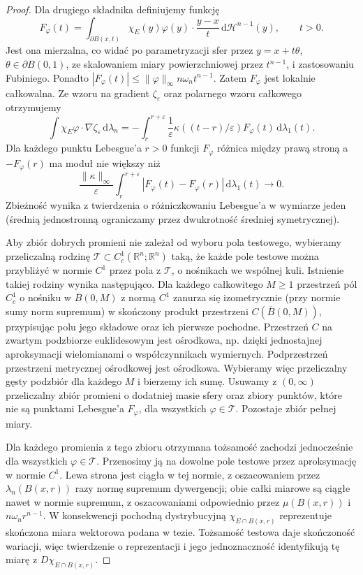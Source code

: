 \begin{proof}
Dla drugiego składnika definiujemy funkcję
\[
 F_\varphi(t)=\int_{\partial B(x,t)}
 \chi_E(y)\varphi(y)\cdot\frac{y-x}{t}
 \,\mathrm d\mathcal H^{n-1}(y),\qquad t>0.
\]
Jest ona mierzalna, co widać po parametryzacji
sfer przez $y=x+t\theta$, $\theta\in\partial B(0,1)$,
ze skalowaniem miary powierzchniowej przez $t^{n-1}$,
i zastosowaniu Fubiniego. Ponadto
$|F_\varphi(t)|\le\|\varphi\|_\infty n\omega_n t^{n-1}$.
Zatem $F_\varphi$ jest lokalnie całkowalna.
Ze wzoru na gradient $\zeta_\varepsilon$ oraz
polarnego wzoru całkowego otrzymujemy
\[
 \int\chi_E\varphi\cdot\nabla\zeta_\varepsilon
 \,\mathrm d\lambda_n
 =-\int_r^{r+\varepsilon}
 \frac1\varepsilon\kappa((t-r)/\varepsilon)
 F_\varphi(t)\,\mathrm d\lambda_1(t).
\]
Dla każdego punktu Lebesgue'a $r>0$ funkcji
$F_\varphi$ różnica między prawą stroną a
$-F_\varphi(r)$ ma moduł nie większy niż
\[
 \frac{\|\kappa\|_\infty}{\varepsilon}
 \int_r^{r+\varepsilon}|F_\varphi(t)-F_\varphi(r)|
 \,\mathrm d\lambda_1(t)\longrightarrow0.
\]
Zbieżność wynika z twierdzenia o różniczkowaniu
Lebesgue'a w wymiarze jeden (średnią jednostronną
ograniczamy przez dwukrotność średniej symetrycznej).

Aby zbiór dobrych promieni nie zależał od wyboru
pola testowego, wybieramy przeliczalną rodzinę
$\mathcal T\subset C_c^1(\mathbb R^n;\mathbb R^n)$
taką, że każde pole testowe można przybliżyć
w normie $C^1$ przez pola z $\mathcal T$,
o nośnikach we wspólnej kuli.
Istnienie takiej rodziny wynika następująco.
Dla każdego całkowitego $M\ge1$ przestrzeń pól
$C_c^1$ o nośniku w $\overline B(0,M)$
z normą $C^1$ zanurza się izometrycznie
(przy normie sumy norm supremum) w skończony
produkt przestrzeni $C(\overline B(0,M))$,
przypisując polu jego składowe oraz ich pierwsze
pochodne. Przestrzeń $C$ na zwartym podzbiorze
euklidesowym jest ośrodkowa, np. dzięki jednostajnej
aproksymacji wielomianami o współczynnikach wymiernych.
Podprzestrzeń przestrzeni metrycznej ośrodkowej
jest ośrodkowa. Wybieramy więc przeliczalny
gęsty podzbiór dla każdego $M$ i bierzemy ich sumę.
Usuwamy z $(0,\infty)$ przeliczalny zbiór promieni
o dodatniej masie sfery oraz zbiory punktów,
które nie są punktami Lebesgue'a $F_\varphi$,
dla wszystkich $\varphi\in\mathcal T$.
Pozostaje zbiór pełnej miary.

Dla każdego promienia z tego zbioru otrzymana
tożsamość zachodzi jednocześnie dla wszystkich
$\varphi\in\mathcal T$. Przenosimy ją na dowolne
pole testowe przez aproksymację w normie $C^1$.
Lewa strona jest ciągła w tej normie, z oszacowaniem
przez $\lambda_n(B(x,r))$ razy normę supremum
dywergencji; obie całki miarowe są ciągłe nawet
w normie supremum, z oszacowaniami odpowiednio
przez $\mu(B(x,r))$ i $n\omega_n r^{n-1}$.
W konsekwencji pochodną dystrybucyjną
$\chi_{E\cap B(x,r)}$ reprezentuje skończona
miara wektorowa podana w tezie. Tożsamość testowa
daje skończoność wariacji, więc twierdzenie o
reprezentacji i jego jednoznaczność identyfikują
tę miarę z $D\chi_{E\cap B(x,r)}$.


\end{proof}
